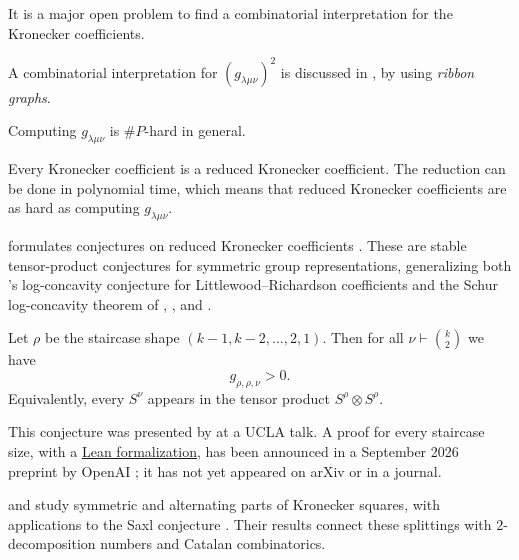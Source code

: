 \begin{problem}[Murnaghan 1938]
It is a major open problem to find a combinatorial interpretation for the Kronecker coefficients.
\end{problem}
A combinatorial interpretation for $(g_{\lambda\mu\nu})^2$ is discussed in \cite{GelounRamgoolam2020},
by using \emph{ribbon graphs}.


\begin{theorem}
Computing $g_{\lambda\mu\nu}$ is $\#P$-hard in general.
\end{theorem}

\begin{theorem}
Every Kronecker coefficient is a reduced Kronecker coefficient.
The reduction can be done in polynomial time, which means that reduced Kronecker coefficients
are as hard as computing $g_{\lambda\mu\nu}$.
\end{theorem}

 formulates conjectures on reduced Kronecker coefficients
\cite{Gui2022x}.  These are stable tensor-product conjectures for symmetric
group representations, generalizing both 's
log-concavity conjecture for Littlewood--Richardson coefficients and the
Schur log-concavity theorem of
, , and .


\begin{conjecture}
\label{saxlConjecture}
Let $\rho$ be the staircase shape $(k-1,k-2,\dotsc,2,1)$.
Then for all $\nu \vdash \binom{k}{2}$ we have
\[
g_{\rho, \rho, \nu} \gt 0.
\]
Equivalently, every $S^{\nu}$ appears in the tensor product $S^\rho \otimes S^\rho$.
\end{conjecture}
This conjecture was presented by  at a UCLA talk.
A proof for every staircase size, with a
\href{https://github.com/openai/math/blob/main/lean/OAI/RepresentationTheory/Saxl/Main.lean}{Lean formalization},
has been announced in a September 2026 preprint by OpenAI
\cite[Thm.~1.1]{OpenAI2026Saxl}; it has not yet appeared on arXiv or in a
journal.


 and  study symmetric and
alternating parts of Kronecker squares, with applications to the Saxl
conjecture \cite{BessenrodtBowman2023}.  Their results connect these splittings
with $2$-decomposition numbers and Catalan combinatorics.

